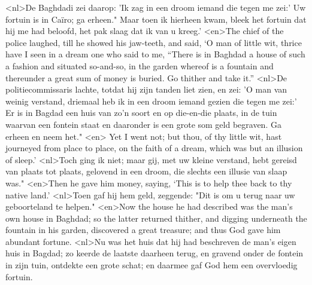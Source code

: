 <nl>De Baghdadi zei daarop: 'Ik zag in een droom iemand die tegen me zei:' Uw fortuin is in Caïro; ga erheen." Maar toen ik hierheen kwam, bleek het fortuin dat hij me had beloofd, het pak slaag dat ik van u kreeg.'
<en>The chief of the police laughed, till he showed his jaw-teeth, and said, ‘O man of little wit, thrice have I seen in a dream one who said to me, “There is in Baghdad a house of such a fashion and situated so-and-so, in the garden whereof is a fountain and thereunder a great sum of money is  buried. Go thither and take it.”
<nl>De politiecommissaris lachte, totdat hij zijn tanden liet zien, en zei: 'O man van weinig verstand, driemaal heb ik in een droom iemand gezien die tegen me zei:' Er is in Bagdad een huis van zo'n soort en op die-en-die plaats, in de tuin waarvan  een fontein staat en daaronder is een grote som geld begraven. Ga erheen en neem het."
<en> Yet I went not; but thou, of thy little wit, hast journeyed from place to place, on the faith of a dream, which was but an illusion of sleep.’ 
<nl>Toch ging ik niet; maar gij, met uw kleine verstand, hebt gereisd van plaats tot plaats, gelovend in een droom, die slechts een illusie van slaap was."
<en>Then he gave him money, saying, ‘This is to help thee back to thy native land.’ 
<nl>Toen gaf hij hem geld, zeggende: "Dit is om u terug naar uw geboorteland te helpen."
<en>Now the house he had described was the man’s own house in Baghdad; so the latter returned thither, and digging underneath the fountain in his garden, discovered a great treasure; and thus God gave him abundant fortune.
<nl>Nu was het huis dat hij had beschreven de man's eigen  huis in Bagdad; zo keerde de laatste daarheen terug, en gravend onder de fontein in zijn tuin, ontdekte een grote schat; en daarmee gaf God hem een overvloedig fortuin.
